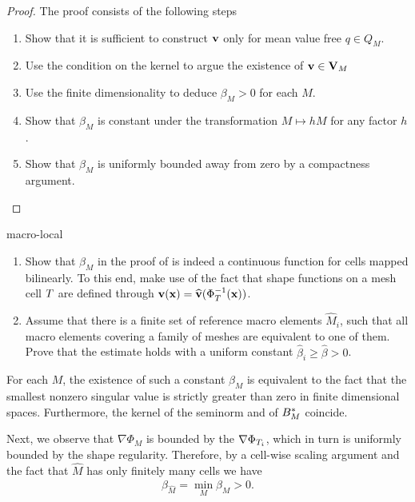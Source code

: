 \begin{proof}
  The proof consists of the following steps
  \begin{enumerate}
  \item Show that it is sufficient to construct $\mathbf v$ only for mean
    value free $q \in Q_M$.
  \item Use the condition on the kernel to argue the existence of $\mathbf v \in \mathbf V_M$
  \item Use the finite dimensionality to deduce $\beta_M>0$ for each $M$.
  \item Show that $\beta_M$ is constant under the transformation
    $M \mapsto h M$ for any factor $h$.
  \item Show that $\beta_M$ is uniformly bounded away from zero by a
    compactness argument.
  \end{enumerate}
\end{proof}

\begin{Problem}{macro-local}
  \begin{enumerate}
  \item Show that $\beta_M$ in the proof of
     is indeed a continuous function for
    cells mapped bilinearly. To this end, make use of the fact that
    shape functions on a mesh cell $T$ are defined through
    $\mathbf v(\mathbf x) = \widehat{\mathbf v}(\Phi_T^{-1}(\mathbf x))$.
  \item   Assume that there is a finite set of reference macro elements
    $\widehat M_i$, such that all macro elements covering a family of
    meshes are equivalent to one of them. Prove that the estimate holds with a uniform
  constant $\widehat\beta_i \ge \widehat\beta>0$.
\end{enumerate}
\begin{solution}
  For each $M$, the existence of such a constant $\beta_{M}$ is
  equivalent to the fact that the smallest nonzero singular value is
  strictly greater than zero in finite dimensional
  spaces. Furthermore, the kernel of the seminorm and of $B_M^*$
  coincide.

  Next, we observe that $\nabla \Phi_{M}$ is bounded by the
  $\nabla\Phi_{T_i}$, which in turn is uniformly bounded by the
  shape regularity. Therefore, by a cell-wise scaling argument and the
  fact that $\widehat M$ has only finitely many cells we have
  \begin{gather}
    \beta_{\widehat M} = \min_M \beta_M > 0.
  \end{gather}
\end{solution}
\end{Problem}

